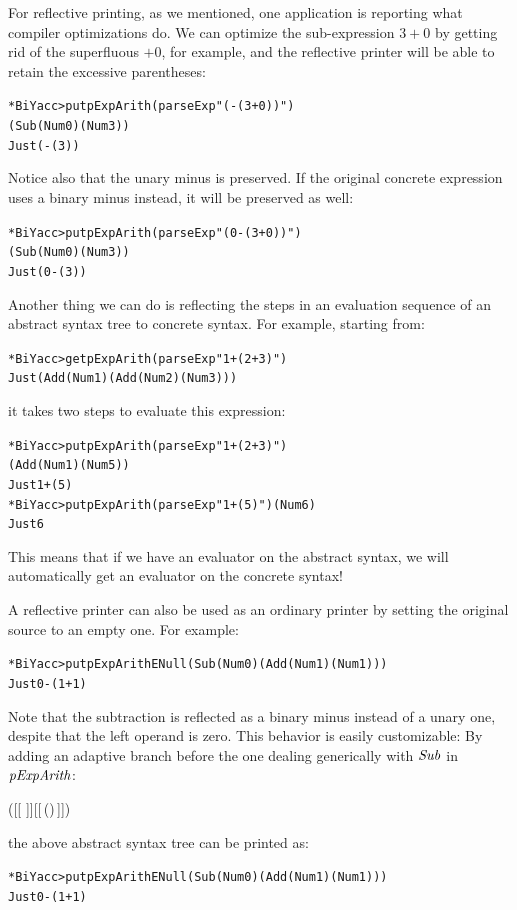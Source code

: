 For reflective printing, as we mentioned, one application is reporting what compiler optimizations do.
We can optimize the sub-expression $3+0$ by getting rid of the superfluous $+0$, for example, and the reflective printer will be able to retain the excessive parentheses:
\begin{alltt}
*BiYacc> put pExpArith (parseExp "(-(3+0))")
                     (Sub (Num 0) (Num 3))
Just (-(3))
\end{alltt}
Notice also that the unary minus is preserved.
If the original concrete expression uses a binary minus instead, it will be preserved as well:
\begin{alltt}
*BiYacc> put pExpArith (parseExp "(0-(3+0))")
                     (Sub (Num 0) (Num 3))
Just (0-(3))
\end{alltt}

Another thing we can do is reflecting the steps in an evaluation sequence of an abstract syntax tree to concrete syntax.
For example, starting from:
\begin{alltt}
*BiYacc> get pExpArith (parseExp "1+(2+3)")
Just (Add (Num 1) (Add (Num 2) (Num 3)))
\end{alltt}
it takes two steps to evaluate this expression:
\begin{alltt}
*BiYacc> put pExpArith (parseExp "1+(2+3)")
                     (Add (Num 1) (Num 5))
Just 1+(5)
*BiYacc> put pExpArith (parseExp "1+(5)") (Num 6)
Just 6
\end{alltt}
This means that if we have an evaluator on the abstract syntax, we will automatically get an evaluator on the concrete syntax!

A reflective printer can also be used as an ordinary printer by setting the original source to an empty one.
For example:
\begin{alltt}
*BiYacc> put pExpArith ENull (Sub (Num 0) (Add (Num 1) (Num 1)))
Just 0-(1+1)
\end{alltt}
Note that the subtraction is reflected as a binary minus instead of a unary one, despite that the left operand is zero.
This behavior is easily customizable:
By adding an adaptive branch before the one dealing generically with \ensuremath{\Conid{Sub}} in \ensuremath{\Varid{pExpArith}}:
\begin{hscode}\SaveRestoreHook
{}%
%
%
\>[B]{}{^\$}(\;[\kern-1.5pt[\,\anonymous \,]\kern-1.5pt]\;[\kern-1.5pt[\,\;(\;)\;\anonymous \,]\kern-1.5pt]){}\<[E]%
\\
\>[B]{}\<[3]%
\>[3]{}\Longrightarrow\lambda \anonymous \;\anonymous \to {}\;\<[E]%
\ColumnHook
\end{hscode}\resethooks
the above abstract syntax tree can be printed as:
\begin{alltt}
*BiYacc> put pExpArith ENull (Sub (Num 0) (Add (Num 1) (Num 1)))
Just 0-(1+1)
\end{alltt}

